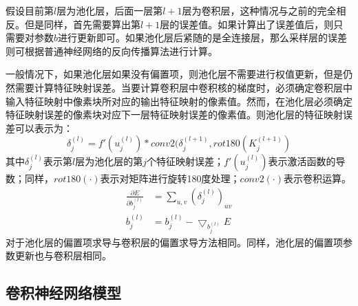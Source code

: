 \begin{enumerate}
假设目前第$l$层为池化层，后面一层第$l+1$层为卷积层，这种情况与之前的完全相反。但是同样，首先需要算出第$l+1$层的误差值。如果计算出了误差值后，则只需要对参数$b$进行更新即可。如果池化层后紧随的是全连接层，那么采样层的误差则可根据普通神经网络的反向传播算法进行计算。

一般情况下，如果池化层如果没有偏置项，则池化层不需要进行权值更新，但是仍然需要计算特征映射误差。当要计算卷积层中卷积核的梯度时，必须确定卷积层中输入特征映射中像素块所对应的输出特征映射的像素值。然而，在池化层必须确定特征映射误差的像素块对应下一层特征映射误差的像素值。则池化层的特征映射误差可以表示为：
\begin{equation}
\delta_{j}^{(l)}=f'(u_{j}^{(l)}) * conv2(\delta_{j}^{(l+1)}, rot180(K_{j}^{(l+1)})
\end{equation}
其中$\delta_{j}^{(l)}$表示第$l$层为池化层的第$j$个特征映射误差；$f'(u_{j}^{(l)})$表示激活函数的导数；同样，$rot180(\cdot)$表示对矩阵进行旋转180度处理；$conv2(\cdot)$表示卷积运算。
\begin{align}
\frac{\partial E}{\partial b_{j}^{(l)}} & = \sum_{u,v} (\delta_{j}^{(l)})_{uv} \\
b_{j}^{(l)} & = b_{j}^{(l)} - \bigtriangledown_{b_{j}^{(l)}} E 
\end{align}
对于池化层的偏置项求导与卷积层的偏置求导方法相同。同样，池化层的偏置项参数更新也与卷积层相同。

\end{enumerate}

\subsection{卷积神经网络模型}

